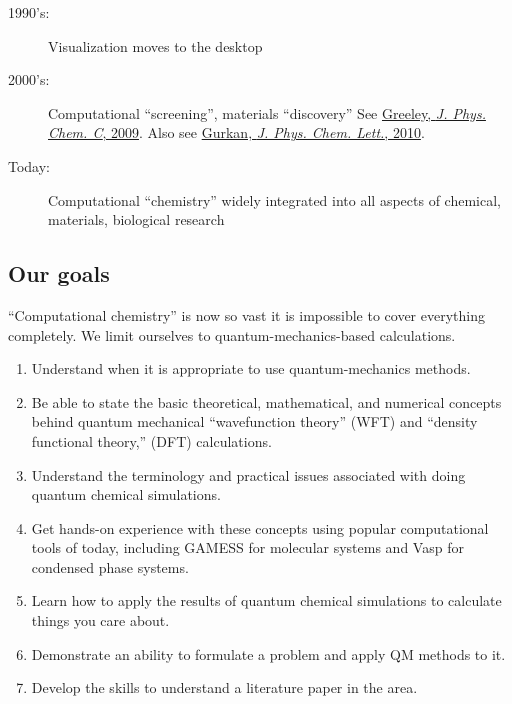 \documentclass[12pt]{article}
\begin{document}
\begin{description}
\item[1990's:] Visualization moves to the desktop

\item[2000's:] Computational ``screening'', materials ``discovery''
See \href{http://www.crc.nd.edu/~wschnei1/courses/CBE_547/Resources/2009_Greeley_JPCc.pdf}{Greeley,
{\em J. Phys. Chem. C}, 2009}.  Also see
\href{http://www.crc.nd.edu/~wschnei1/courses/CBE_547/Resources/2010_Gurkan_JPCL.pdf}{Gurkan,
{\em J. Phys. Chem. Lett.}, 2010}.

\item[Today:] Computational ``chemistry'' widely integrated into all aspects
of chemical, materials, biological research
\end{description}

\subsection{Our goals}
``Computational chemistry'' is now so vast it is impossible to cover
everything completely.  We limit ourselves to quantum-mechanics-based
calculations.

\begin{enumerate}
\item Understand when it is appropriate to use quantum-mechanics
  methods.
\item Be able to state the basic theoretical, mathematical, and numerical
  concepts behind quantum mechanical “wavefunction theory” (WFT) and
  “density functional theory,” (DFT) calculations.  
\item Understand the terminology and practical issues associated with doing quantum chemical simulations.
\item Get hands-on experience with these concepts using popular
  computational tools of today, including GAMESS for molecular
  systems and Vasp for condensed phase systems.
\item Learn how to apply the results of quantum chemical
  simulations to calculate
  things you care about.
\item Demonstrate an ability to formulate a problem and apply QM
  methods to it.
\item Develop the skills to understand a literature paper in the area.
\end{enumerate}
\end{document}
